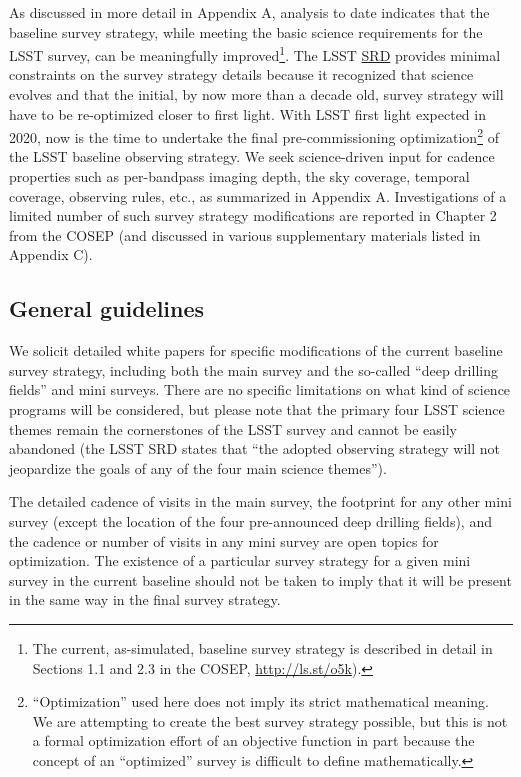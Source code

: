 \documentclass[DM,lsstdraft,toc,usenatbib]{lsstdoc}
\begin{document}
As discussed in more detail in Appendix A, analysis to date indicates that the baseline 
survey strategy, while meeting the basic science requirements for the LSST survey, can be meaningfully 
improved\footnote{The current, as-simulated, baseline survey strategy is described in detail in Sections 1.1 
and 2.3 in the COSEP, \href{http://ls.st/o5k}{http://ls.st/o5k}).}.
The LSST \href{http://ls.st/srd}{SRD}
provides minimal constraints on the survey strategy details because it recognized that science evolves and that the 
initial, by now more than a decade old, survey strategy will have to be re-optimized closer to first 
light. With LSST first light expected in 2020, now is the time to undertake the final pre-commissioning
optimization\footnote{``Optimization'' used here does not imply its strict mathematical meaning. 
We are attempting to create the best survey strategy possible, but this is not a formal optimization 
effort of an objective function in part because the concept of an ``optimized'' survey is difficult to 
define mathematically.} 
of the LSST baseline observing strategy. We seek science-driven input for cadence 
properties such as per-bandpass imaging depth, the sky coverage, temporal coverage, observing
rules, etc., as summarized in Appendix A. Investigations of a limited number of such survey strategy 
modifications are reported in Chapter 2 from the COSEP (and discussed 
in various supplementary materials listed in Appendix C). 


\subsection{General guidelines} 

We solicit detailed white papers for specific modifications of the current baseline survey strategy, including 
both the main survey and the so-called ``deep drilling fields'' and mini surveys. There are no 
specific limitations on what kind of science programs will be considered, but please note that 
the primary four LSST science themes remain the cornerstones of the LSST survey and cannot 
be easily abandoned (the LSST SRD states that ``the adopted observing 
strategy will not jeopardize the goals of any of the four main science themes'').  

The detailed cadence of visits in the main survey, the footprint for any other mini survey (except the location of the four pre-announced
deep drilling fields), and the cadence or number of visits in any mini survey are open topics for optimization. The existence of a 
particular survey strategy for a given mini survey in the current baseline should not be taken to imply that it will be present in the same way in the final 
survey strategy. 
\end{document}

